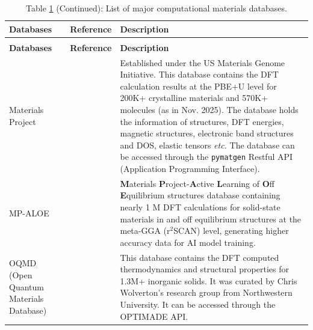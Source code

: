 \begin{longtable}{p{3cm}p{3cm}p{11cm}}
\caption{List of major computational materials databases.}
    \label{tab:materials_databases}\\
    
    \hline\hline
     \textbf{\footnotesize{Databases}}    & \textbf{\footnotesize{Reference}}  & 
     \textbf{\footnotesize{Description}}\\
     \hline
     \endfirsthead
\caption*{Table \ref{tab:materials_databases} (Continued): List of major computational materials databases.}\\\toprule
     \textbf{\footnotesize{Databases}}    & \textbf{\footnotesize{Reference}}  &  
     \textbf{\footnotesize{Description}}\\
     \hline
\endhead
\hline\hline
\endfoot
\hline\hline
\endlastfoot

\footnotesize{Materials Project}
&\footnotesize{\citet{jain_apl_mater}}
&\footnotesize{Established under the US Materials Genome Initiative. This database contains the DFT calculation results at the PBE+U level for 200K+ crystalline materials and 570K+ molecules (as in Nov. 2025). The database holds the information of structures, DFT energies, magnetic structures, electronic band structures and DOS, elastic tensors \emph{etc.} The database can be accessed through the \texttt{pymatgen}\cite{ong2013python} Restful API (Application Programming Interface).}\\

\footnotesize{MP-ALOE}
&\footnotesize{\citet{kuner2025mp}}
&{\footnotesize{\textbf{M}aterials \textbf{P}roject-\textbf{A}ctive \textbf{L}earning of \textbf{O}ff
\textbf{E}quilibrium structures} database containing nearly 1 M DFT calculations for solid-state materials in and off equilibrium structures at the meta-GGA (r$^2$SCAN)\cite{furness2020accurate} level, generating higher accuracy data for AI model training.}\\

\footnotesize{OQMD (Open Quantum Materials Database)}
&\footnotesize{\citet{saal2013materials}}
&\footnotesize{This database contains the DFT computed thermodynamics and structural properties for 1.3M+ inorganic solids. It was curated by Chris Wolverton's research group from  Northwestern University.  It can be accessed through the OPTIMADE\cite{optimade} API.}\\


\end{longtable}
